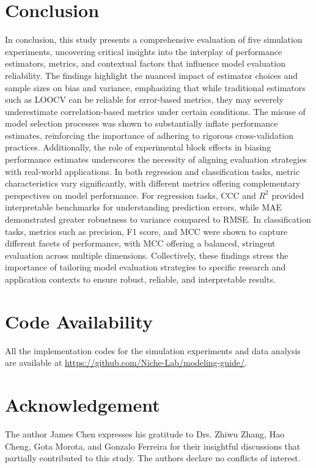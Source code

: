 \section{Conclusion}

In conclusion, this study presents a comprehensive evaluation of five simulation experiments, uncovering critical insights into the interplay of performance estimators, metrics, and contextual factors that influence model evaluation reliability. The findings highlight the nuanced impact of estimator choices and sample sizes on bias and variance, emphasizing that while traditional estimators such as LOOCV can be reliable for error-based metrics, they may severely underestimate correlation-based metrics under certain conditions. The misuse of model selection processes was shown to substantially inflate performance estimates, reinforcing the importance of adhering to rigorous cross-validation practices. Additionally, the role of experimental block effects in biasing performance estimates underscores the necessity of aligning evaluation strategies with real-world applications. In both regression and classification tasks, metric characteristics vary significantly, with different metrics offering complementary perspectives on model performance. For regression tasks, CCC and $R^2$ provided interpretable benchmarks for understanding prediction errors, while MAE demonstrated greater robustness to variance compared to RMSE. In classification tasks, metrics such as precision, F1 score, and MCC were shown to capture different facets of performance, with MCC offering a balanced, stringent evaluation across multiple dimensions. Collectively, these findings stress the importance of tailoring model evaluation strategies to specific research and application contexts to ensure robust, reliable, and interpretable results.

\section{Code Availability}

All the implementation codes for the simulation experiments and data analysis are available at \url{https://github.com/Niche-Lab/modeling-guide/}.

\section{Acknowledgement}
The author James Chen expresses his gratitude to Drs. Zhiwu Zhang, Hao Cheng, Gota Morota, and Gonzalo Ferreira for their insightful discussions that partially contributed to this study. The authors declare no conflicts of interest.
